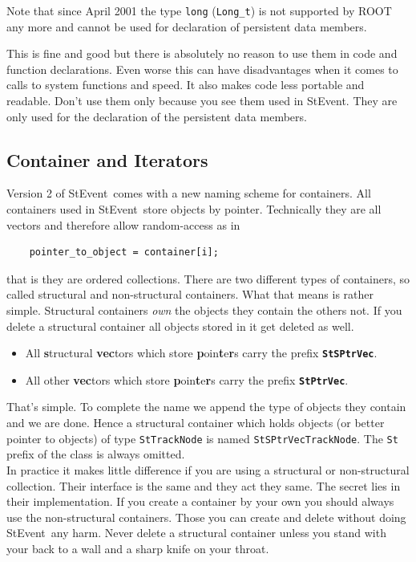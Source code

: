 \documentclass[twoside]{article}
\newcommand{\StEvent}{\textsf{StEvent}}
\begin{document}
Note that since April 2001 the type \texttt{long} (\texttt{Long\_t}) is not supported
by ROOT any more and cannot be used for declaration of persistent data members.

This is fine and good but there is absolutely no reason to use them in
code and function declarations.  Even worse
this can have disadvantages when it comes to calls to system functions
and speed. It also makes code less portable and readable.  Don't use
them only because you see them used in \StEvent. They are only used
for the declaration of the persistent data members.

\subsection{Container and Iterators}
\label{sec:Container}
  Version 2 of \StEvent\ comes with
a new naming scheme for containers.  All containers used in \StEvent\
store objects by pointer. Technically they are all vectors and
therefore allow random-access as in
\begin{verbatim}
    pointer_to_object = container[i];
\end{verbatim}
that is they are ordered collections. There are two different types of
containers, so called structural and non-structural containers.  What
that means is rather simple. Structural containers \emph{own} the
objects they contain the others not. If you delete a structural
container all objects stored in it get deleted as well.
\begin{itemize}
\item All \textbf{s}tructural \textbf{vec}tors which store
    \textbf{p}oin\textbf{t}e\textbf{r}s carry the prefix \textbf{\texttt{StSPtrVec}}.\\
\item All other \textbf{vec}tors which store
    \textbf{p}oin\textbf{t}e\textbf{r}s carry the prefix
    \textbf{\texttt{StPtrVec}}.
\end{itemize}
That's simple. To complete the name we append the type of objects they
contain and we are done. Hence a structural container which holds
objects (or better pointer to objects) of type \texttt{StTrackNode} is
named \texttt{StSPtrVecTrackNode}. The \texttt{St} prefix of the class
is always omitted.\\
In practice it makes little difference if you are using a structural
or non-structural collection. Their interface is the same and they act
they same. The secret lies in their implementation. If you create a
container by your own you should always use the non-structural
containers. Those you can create and delete without doing \StEvent\
any harm. Never delete a structural container unless you stand with
your back to a wall and a sharp knife on your throat.
\end{document}
